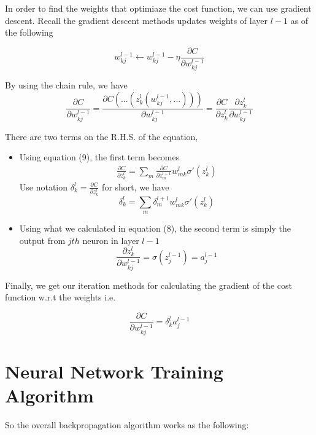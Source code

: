 \documentclass[12pt, oneside]{article}
\begin{document}
In order to find the weights that optimiaze the cost function, we can use gradient descent. Recall the gradient descent methods updates weights of layer $l-1$ as of the following

\begin{equation}
w_{kj}^{l-1} \leftarrow w_{kj}^{l-1}-\eta \frac{\partial C}{\partial w_{kj}^{l-1}}
\end{equation}

By using the chain rule, we have 
\begin{equation}
\frac{\partial C}{\partial w_{kj}^{l-1}}
=\frac{\partial C(...(z^l_k(w_{kj}^{l-1},...)))}{\partial w_{kj}^{l-1}}
=\frac{\partial C}{\partial z_k^l}\frac{\partial z_k^l}{\partial w_{kj}^{l-1}}
\end{equation}

There are two terms on the R.H.S. of the equation, 

\begin{itemize}

\item Using equation (9), the first term becomes 
\begin{align*}
\frac{\partial C}{\partial z_k^l}=\sum_m \frac{\partial C}{\partial z_m^{l+1}} w^l_{mk}\sigma'(z_k^l)
\end{align*}
Use notation $\delta^l_k=\frac{\partial C}{\partial z_k^l}$ for short, we have
\begin{equation}
\delta^l_k=\sum_m \delta^{l+1}_m w^l_{mk}\sigma'(z_k^l)
\end{equation}

\item Using what we calculated in equation (8), the second term is simply the output from $jth$ neuron in layer $l-1$ 
\begin{equation}
\frac{\partial z_k^l}{\partial w_{kj}^{l-1}}=\sigma({z^{l-1}_j})=a^{l-1}_j
\end{equation}

\end{itemize}


Finally, we get our iteration methods for calculating the gradient of the cost function w.r.t the weights i.e.

\begin{equation}
\frac{\partial C}{\partial w_{kj}^{l-1}}=\delta_k^{l}a_j^{l-1}
\end{equation}

\section{Neural Network Training Algorithm}
So the overall backpropagation algorithm works as the following:
\end{document}
